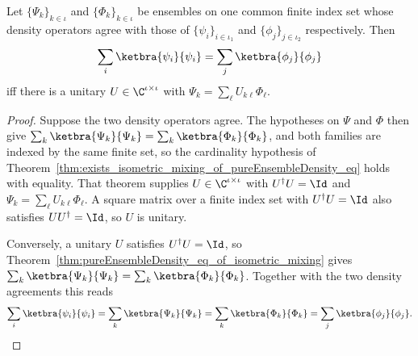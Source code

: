 \begin{theorem}
    \label{thm:pureEnsembleDensity_eq_iff_exists_unitary_mixing_of_pad}
    \leanok
    Let $\{\Psi_k\}_{k \in \iota}$ and $\{\Phi_k\}_{k \in \iota}$ be ensembles
    on one common finite index set whose density operators agree with those of
    $\{\psi_i\}_{i \in \iota_1}$ and $\{\phi_j\}_{j \in \iota_2}$ respectively.
    Then
    \begin{align}
        \sum_i \ketbra{\psi_i}{\psi_i} = \sum_j \ketbra{\phi_j}{\phi_j}
    \end{align}
    iff there is a unitary $U \in \C^{\iota \times \iota}$ with
    $\Psi_k = \sum_\ell U_{k\ell}\Phi_\ell$.
\end{theorem}

\begin{proof}
    \leanok
    Suppose the two density operators agree. The hypotheses on $\Psi$ and
    $\Phi$ then give $\sum_k \ketbra{\Psi_k}{\Psi_k} = \sum_k
    \ketbra{\Phi_k}{\Phi_k}$, and both families are indexed by the same finite
    set, so the cardinality hypothesis of
    Theorem~\ref{thm:exists_isometric_mixing_of_pureEnsembleDensity_eq} holds
    with equality. That theorem supplies $U \in \C^{\iota\times\iota}$ with
    $U^\dagger U = \Id$ and $\Psi_k = \sum_\ell U_{k\ell}\Phi_\ell$. A square
    matrix over a finite index set with $U^\dagger U = \Id$ also satisfies
    $U U^\dagger = \Id$, so $U$ is unitary.

    Conversely, a unitary $U$ satisfies $U^\dagger U = \Id$, so
    Theorem~\ref{thm:pureEnsembleDensity_eq_of_isometric_mixing} gives
    $\sum_k \ketbra{\Psi_k}{\Psi_k} = \sum_k \ketbra{\Phi_k}{\Phi_k}$. Together
    with the two density agreements this reads
    \begin{align}
        \sum_i \ketbra{\psi_i}{\psi_i}
        = \sum_k \ketbra{\Psi_k}{\Psi_k}
        = \sum_k \ketbra{\Phi_k}{\Phi_k}
        = \sum_j \ketbra{\phi_j}{\phi_j}.
    \end{align}
\end{proof}

